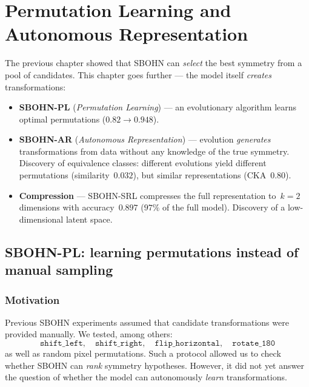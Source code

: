 \documentclass[11pt,a4paper]{report}
\begin{document}
\newpage


\chapter{Permutation Learning and Autonomous Representation}

The previous chapter showed that SBOHN can \emph{select} the best symmetry from a pool of candidates. This chapter goes further --- the model itself \emph{creates} transformations:

\begin{itemize}
\item \textbf{SBOHN-PL} (\emph{Permutation Learning}) --- an evolutionary algorithm learns optimal permutations ($0.82 \to 0.948$).
\item \textbf{SBOHN-AR} (\emph{Autonomous Representation}) --- evolution \emph{generates} transformations from data without any knowledge of the true symmetry. Discovery of equivalence classes: different evolutions yield different permutations (similarity~$0.032$), but similar representations (CKA~$0.80$).
\item \textbf{Compression} --- SBOHN-SRL compresses the full representation to~$k{=}2$ dimensions with accuracy~$0.897$ ($97\%$ of the full model). Discovery of a low-dimensional latent space.
\end{itemize}


\section{SBOHN-PL: learning permutations instead of manual sampling}\label{sec:sbohn_pl}

\subsection{Motivation}

Previous SBOHN experiments assumed that candidate transformations were provided manually. We tested, among others:
\[
\texttt{shift\_left},\quad
\texttt{shift\_right},\quad
\texttt{flip\_horizontal},\quad
\texttt{rotate\_180}
\]
as well as random pixel permutations. Such a protocol allowed us to check whether SBOHN can \emph{rank} symmetry hypotheses. However, it did not yet answer the question of whether the model can autonomously \emph{learn} transformations.
\end{document}
